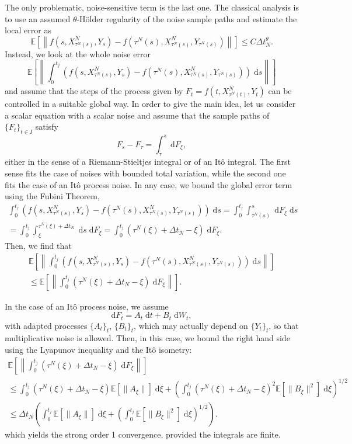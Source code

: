 \documentclass[reqno,12pt]{amsart}
\theoremstyle{plain} %
\theoremstyle{definition} %
\begin{document}
The only problematic, noise-sensitive term is the last one. The classical analysis is to use an assumed $\theta$-H\"older regularity of the noise sample paths and estimate the local error as
\[
    \mathbb{E}\left[\left\|f(s, X_{\tau^N(s)}^N, Y_s) - f(\tau^N(s), X_{\tau^N(s)}^N, Y_{\tau^N(s)})\right\|\right] \leq C\Delta t_N^{\theta}.
\]
Instead, we look at the whole noise error 
\[
    \mathbb{E}\left[\left\|\int_0^{t_j} \left( f(s, X_{\tau^N(s)}^N, Y_s) - f(\tau^N(s), X_{\tau^N(s)}^N, Y_{\tau^N(s)}) \right)\;\mathrm{d}s\right\|\right]
\]
and assume that the steps of the process given by $F_t = f(t, X_{\tau^N(t)}^N, Y_t)$ can be controlled in a suitable global way. In order to give the main idea, let us consider a scalar equation with a scalar noise and assume that the sample paths of $\{F_t\}_{t\in I}$ satisfy
\[
    F_s - F_\tau = \int_\tau^s \;\mathrm{d}F_\xi,
\]
either in the sense of a Riemann-Stieltjes integral or of an It\^o integral. The first sense fits the case of noises with bounded total variation, while the second one fits the case of an It\^o process noise. In any case, we bound the global error term using the Fubini Theorem,
\begin{multline*}
    \int_0^{t_j} \left( f(s, X_{\tau^N(s)}^N, Y_s) - f(\tau^N(s), X_{\tau^N(s)}^N, Y_{\tau^N(s)}) \right)\;\mathrm{d}s = \int_0^{t_j} \int_{\tau^N(s)}^s \;\mathrm{d}  F_\xi\;\mathrm{d}s \\
    = \int_0^{t_j} \int_{\xi}^{\tau^N(\xi) + \Delta t_N} \;\mathrm{d}s \;\mathrm{d} F_\xi  = \int_0^{t_j} (\tau^N(\xi) + \Delta t_N - \xi) \;\mathrm{d} F_\xi.
\end{multline*}
Then, we find that
\begin{multline*}
    \mathbb{E}\left[\left\| \int_0^{t_j} \left( f(s, X_{\tau^N(s)}^N, Y_s) - f(\tau^N(s), X_{\tau^N(s)}^N, Y_{\tau^N(s)}) \right)\;\mathrm{d}s\right\|\right] \\
    \leq \mathbb{E}\left[\left\| \int_0^{t_j} (\tau^N(\xi) + \Delta t_N - \xi) \;\mathrm{d} F_\xi \right\|\right].
\end{multline*}

In the case of an It\^o process noise, we assume
\[
    \mathrm{d}F_t = A_t\;\mathrm{d}t + B_t\;\mathrm{d}W_t,
\]
with adapted processes $\{A_t\}_t$, $\{B_t\}_t$, which may actually depend on $\{Y_t\}_t$, so that multiplicative noise is allowed. Then, in this case, we bound the right hand side using the Lyapunov inequality and the It\^o isometry:
\begin{multline*}
    \mathbb{E}\left[\left\| \int_0^{t_j} (\tau^N(\xi) + \Delta t_N - \xi) \;\mathrm{d} F_\xi \right\|\right] \\
    \leq \int_0^{t_j} (\tau^N(\xi) + \Delta t_N - \xi) \mathbb{E}[\|A_\xi\|] \;\mathrm{d}\xi + \left( \int_0^{t_j} (\tau^N(\xi) + \Delta t_N - \xi)^2 \mathbb{E}[\|B_\xi\|^2]\;\mathrm{d} \xi\right)^{1/2} \\ 
    \leq \Delta t_N\left(\int_0^{t_j} \mathbb{E}[\|A_\xi\|]\;\mathrm{d} \xi + \left( \int_0^{t_j} \mathbb{E}[\|B_\xi\|^2] \;\mathrm{d}\xi \right)^{1/2} \right).
\end{multline*}
which yields the strong order 1 convergence, provided the integrals are finite.
\end{document}
